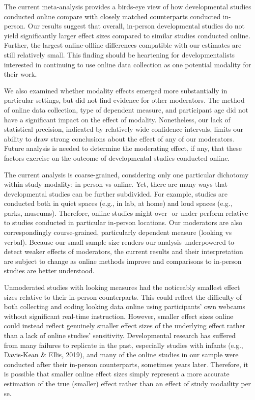 \documentclass[
  man,floatsintext]{apa6}
\begin{document}
The current meta-analysis provides a birds-eye view of how developmental studies conducted online compare with closely matched counterparts conducted in-person. Our results suggest that overall, in-person developmental studies do not yield significantly larger effect sizes compared to similar studies conducted online. Further, the largest online-offline differences compatible with our estimates are still relatively small. This finding should be heartening for developmentalists interested in continuing to use online data collection as one potential modality for their work.

We also examined whether modality effects emerged more substantially in particular settings, but did not find evidence for other moderators. The method of online data collection, type of dependent measure, and participant age did not have a significant impact on the effect of modality. Nonetheless, our lack of statistical precision, indicated by relatively wide confidence intervals, limits our ability to draw strong conclusions about the effect of any of our moderators. Future analysis is needed to determine the moderating effect, if any, that these factors exercise on the outcome of developmental studies conducted online.

The current analysis is coarse-grained, considering only one particular dichotomy within study modality: in-person vs online. Yet, there are many ways that developmental studies can be further subdivided. For example, studies are conducted both in quiet spaces (e.g., in lab, at home) and loud spaces (e.g., parks, museums). Therefore, online studies might over- or under-perform relative to studies conducted in particular in-person locations. Our moderators are also correspondingly course-grained, particularly dependent measure (looking vs verbal). Because our small sample size renders our analysis underpowered to detect weaker effects of moderators, the current results and their interpretation are subject to change as online methods improve and comparisons to in-person studies are better understood.

Unmoderated studies with looking measures had the noticeably smallest effect sizes relative to their in-person counterparts. This could reflect the difficulty of both collecting and coding looking data online using participants' own webcams without significant real-time instruction. However, smaller effect sizes online could instead reflect genuinely smaller effect sizes of the underlying effect rather than a lack of online studies' sensitivity. Developmental research has suffered from many failures to replicate in the past, especially studies with infants (e.g., Davis-Kean \& Ellis, 2019), and many of the online studies in our sample were conducted after their in-person counterparts, sometimes years later. Therefore, it is possible that smaller online effect sizes simply represent a more accurate estimation of the true (smaller) effect rather than an effect of study modaility per se.
\end{document}
